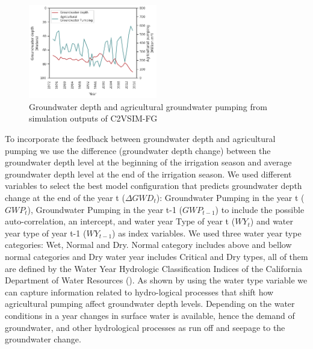 \documentclass[11pt,a4paper]{article}
\begin{document}
\begin{figure}[H]
    \centering
    \includegraphics[width=0.5\textwidth]{c2vsim_semitropic.png}
    \caption{Groundwater depth and agricultural groundwater pumping from simulation outputs of C2VSIM-FG}
    \label{fig:mes1h1}
\end{figure}

To incorporate the feedback between groundwater depth and agricultural pumping we use the difference (groundwater depth change) between the groundwater depth level at the beginning of the irrigation season and average groundwater depth level at the end of the irrigation season. We used different variables to select the best model configuration that predicts groundwater depth change at the end of the year t ($\Delta GWD_{t}$): Groundwater Pumping in the year t ($GWP_{t}$), Groundwater Pumping in the year t-1 ($GWP_{t-1}$) to include the possible auto-correlation, an intercept, and water year Type of year t ($WY_{t}$) and water year type of year t-1 ($WY_{t-1}$) as index variables. We used three water year type categories: Wet, Normal and Dry. Normal category includes above and bellow normal categories and Dry water year includes Critical and Dry types, all of them are defined by the Water Year Hydrologic Classification Indices of the California Department of Water Resources (\cite{dwr_california_2020}). As shown by \textcite{macewan_hydroeconomic_2017} using the water type variable we can capture information related to hydro-logical processes that shift how agricultural pumping affect groundwater depth levels. Depending on the water conditions in a year changes in surface water is available, hence the demand of groundwater, and other hydrological processes as run off and seepage to the groundwater change. 
\end{document}
